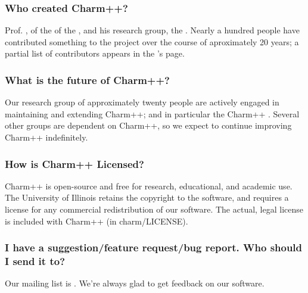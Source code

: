 \subsubsection{Who created Charm++?}

Prof. , of the
of the ,
and his research group, the .
Nearly a hundred people have contributed something
to the project over the course of aproximately 20 years; a partial list
of contributors appears in the 's page.

\subsubsection{What is the future of Charm++?}

Our research group of approximately twenty people are actively engaged
in maintaining and extending Charm++; and in particular the Charm++ 
.
Several other groups are dependent on Charm++, so we expect to continue
improving Charm++ indefinitely.

\subsubsection{How is Charm++ Licensed?}

Charm++ is open-source and free for research, educational, and academic
use. The University of Illinois retains the copyright to the software,
and requires a license for any commercial redistribution of our software.
The actual, legal license is included with Charm++ (in charm/LICENSE).

\subsubsection{I have a suggestion/feature request/bug report. Who should I send
it to?}

Our mailing list is .
We're always glad to get feedback on our software.

